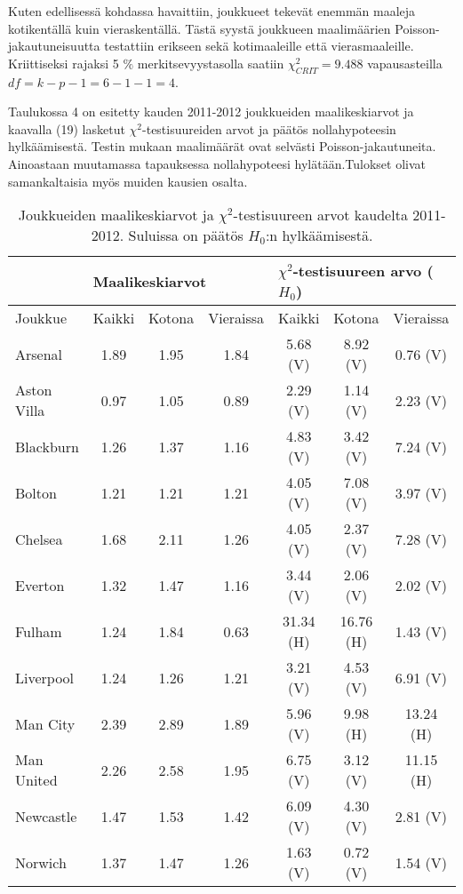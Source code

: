 \documentclass[a4paper,finnish,titlepage,12pt]{article}
\begin{document}
Kuten edellisessä kohdassa havaittiin, joukkueet tekevät enemmän maaleja kotikentällä kuin vieraskentällä. Tästä syystä joukkueen maalimäärien Poisson-jakautuneisuutta testattiin erikseen sekä kotimaaleille että vierasmaaleille. Kriittiseksi rajaksi 5 $\%$ merkitsevyystasolla saatiin $\chi^2_{CRIT} = 9.488$  vapausasteilla $df = k - p - 1 = 6 - 1 - 1 = 4$.

Taulukossa 4 on esitetty kauden 2011-2012 joukkueiden maalikeskiarvot ja kaavalla (19) lasketut $\chi^2$-testisuureiden arvot ja päätös nollahypoteesin hylkäämisestä. Testin mukaan maalimäärät ovat selvästi Poisson-jakautuneita. Ainoastaan muutamassa tapauksessa nollahypoteesi hylätään.Tulokset olivat samankaltaisia myös muiden kausien osalta.

\begin{table}[h!]
\caption{Joukkueiden maalikeskiarvot ja $\chi^2$-testisuureen arvot kaudelta 2011-2012. Suluissa on päätös $H_0$:n hylkäämisestä.}
\begin{center}
    \begin{tabular}{|l||c|c|c||c|c|c|}
	\hline
 	& \multicolumn{3}{l||}{Maalikeskiarvot} & \multicolumn{3}{l|}{$\chi^2$-testisuureen arvo ($H_0$)} \\
	\hline
	Joukkue & Kaikki & Kotona & Vieraissa & Kaikki & Kotona & Vieraissa \\	
	\hline
	Arsenal & 1.89 & 1.95 & 1.84 & 5.68 (V) & 8.92 (V) & 0.76 (V) \\
	Aston Villa & 0.97 & 1.05 & 0.89 & 2.29 (V) & 1.14 (V) & 2.23 (V) \\
	Blackburn & 1.26 & 1.37 & 1.16 & 4.83 (V) & 3.42 (V) & 7.24 (V) \\
	Bolton & 1.21 & 1.21 & 1.21 & 4.05 (V) & 7.08 (V) & 3.97 (V) \\
	Chelsea & 1.68 & 2.11 & 1.26 & 4.05 (V) & 2.37 (V) & 7.28 (V) \\
	Everton & 1.32 & 1.47 & 1.16 & 3.44 (V) & 2.06 (V) & 2.02 (V) \\
	Fulham & 1.24 & 1.84 & 0.63 & 31.34 (H) & 16.76 (H) & 1.43 (V) \\
	Liverpool & 1.24 & 1.26 & 1.21 & 3.21 (V) & 4.53 (V) & 6.91 (V) \\
	Man City & 2.39 & 2.89 & 1.89 & 5.96 (V) & 9.98 (H) & 13.24 (H) \\
	Man United & 2.26 & 2.58 & 1.95 & 6.75 (V) & 3.12 (V) & 11.15 (H) \\
	Newcastle & 1.47 & 1.53 & 1.42 & 6.09 (V) & 4.30 (V) & 2.81 (V) \\
	Norwich & 1.37 & 1.47 & 1.26 & 1.63 (V) & 0.72 (V) & 1.54 (V) \\

\end{tabular}
\end{center}
\end{table}
\end{document}
